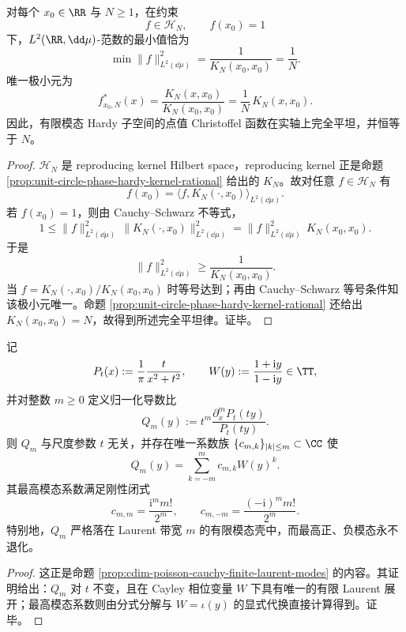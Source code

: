 \begin{theorem}\label{thm:conclusion-hardy-christoffel-complete-flatness}
对每个 \(x_0\in\RR\) 与 \(N\ge 1\)，在约束
\[
f\in\mathcal H_N,
\qquad
f(x_0)=1
\]
下，\(L^2(\RR,\dd\mu)\)-范数的最小值恰为
\[
\min\|f\|_{L^2(\dd\mu)}^2=\frac{1}{K_N(x_0,x_0)}=\frac1N.
\]
唯一极小元为
\[
f^\ast_{x_0,N}(x)=\frac{K_N(x,x_0)}{K_N(x_0,x_0)}=\frac1N\,K_N(x,x_0).
\]
因此，有限模态 Hardy 子空间的点值 Christoffel 函数在实轴上完全平坦，并恒等于 \(N\)。
\end{theorem}
\begin{proof}
\(\mathcal H_N\) 是 reproducing kernel Hilbert space，reproducing kernel 正是命题 \ref{prop:unit-circle-phase-hardy-kernel-rational} 给出的 \(K_N\)。故对任意 \(f\in\mathcal H_N\) 有
\[
f(x_0)=\langle f,K_N(\cdot,x_0)\rangle_{L^2(\dd\mu)}.
\]
若 \(f(x_0)=1\)，则由 Cauchy--Schwarz 不等式，
\[
1\le \|f\|_{L^2(\dd\mu)}^2\,\|K_N(\cdot,x_0)\|_{L^2(\dd\mu)}^2
=
\|f\|_{L^2(\dd\mu)}^2\,K_N(x_0,x_0).
\]
于是
\[
\|f\|_{L^2(\dd\mu)}^2\ge \frac1{K_N(x_0,x_0)}.
\]
当 \(f=K_N(\cdot,x_0)/K_N(x_0,x_0)\) 时等号达到；再由 Cauchy--Schwarz 等号条件知该极小元唯一。命题 \ref{prop:unit-circle-phase-hardy-kernel-rational} 还给出 \(K_N(x_0,x_0)=N\)，故得到所述完全平坦律。证毕。
\end{proof}

\begin{theorem}\label{thm:conclusion-poisson-cauchy-derivative-ratio-finite-laurent-rigidity}
记
\[
P_t(x):=\frac{1}{\pi}\frac{t}{x^2+t^2},
\qquad
W(y):=\frac{1+\mathrm{i}y}{1-\mathrm{i}y}\in\TT,
\]
并对整数 \(m\ge 0\) 定义归一化导数比
\[
Q_m(y):=t^m\frac{\partial_x^m P_t(ty)}{P_t(ty)}.
\]
则 \(Q_m\) 与尺度参数 \(t\) 无关，并存在唯一系数族 \(\{c_{m,k}\}_{|k|\le m}\subset\CC\) 使
\[
Q_m(y)=\sum_{k=-m}^{m}c_{m,k}W(y)^k.
\]
其最高模态系数满足刚性闭式
\[
c_{m,m}=\frac{\mathrm{i}^m m!}{2^m},
\qquad
c_{m,-m}=\frac{(-\mathrm{i})^m m!}{2^m}.
\]
特别地，\(Q_m\) 严格落在 Laurent 带宽 \(m\) 的有限模态壳中，而最高正、负模态永不退化。
\end{theorem}
\begin{proof}
这正是命题 \ref{prop:cdim-poisson-cauchy-finite-laurent-modes} 的内容。其证明给出：\(Q_m\) 对 \(t\) 不变，且在 Cayley 相位变量 \(W\) 下具有唯一的有限 Laurent 展开；最高模态系数则由分式分解与 \(W=\iota(y)\) 的显式代换直接计算得到。证毕。
\end{proof}

